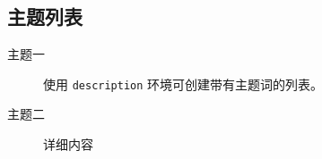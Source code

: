 \subsection{主题列表}
\begin{description}
	\item[主题一] 使用 \lstinline{description} 环境可创建带有主题词的列表。
	\item[主题二] 详细内容
\end{description} 